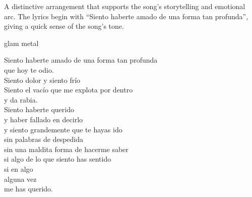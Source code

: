 
\label{sec:siento}

\begin{notes}
A distinctive arrangement that supports the song's storytelling and emotional arc. %
The lyrics begin with “Siento haberte amado de una forma tan profunda”, giving a quick sense of the song’s tone.
\end{notes}

\begin{style}
glam metal
\end{style}

\begin{lyrics}

Siento haberte amado de una forma tan profunda\\
que hoy te odio.\\
Siento dolor y siento frío\\
Siento el vacío que me explota por dentro\\
y da rabia.\\
Siento haberte querido\\
y haber fallado en decirlo\\
y siento grandemente que te hayas ido\\
sin palabras de despedida\\
sin una maldita forma de hacerme saber\\
si algo de lo que siento has sentido\\
si en algo\\
alguna vez\\
me has querido.

\end{lyrics}


